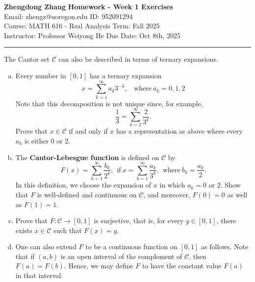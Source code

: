 \documentclass[letterpaper, 12pt]{article}
\begin{document}
\noindent
\large\textbf{Zhengdong Zhang} \hfill \textbf{Homework - Week 1 Exercises}   \\
Email: zhengz@uoregon.edu \hfill ID: 952091294 \\
\normalsize Course: MATH 616 - Real Analysis \hfill Term: Fall 2025 \\
Instructor: Professor Weiyong He \hfill Due Date: Oct 8th, 2025 \\
\noindent\rule{7in}{2.8pt}
\begin{problem}{1.2}
The Cantor set \(\mathcal{C}\) can also be described in terms of ternary expansions.
\begin{enumerate}[(a)]
    \item Every number in \([0,1]\) has a ternary expansion 
          \[x=\sum_{k=1}^\infty a_k 3^{-k},\ \ \ \ \text{where}\ a_k=0,1,2\]
          Note that this decomposition is not unique since, for example, 
          \[\frac{1}{3}=\sum_{k=2}^\infty \frac{2}{3^k}.\]
          Prove that \(x\in \mathcal{C}\) if and only if \(x\) has a representation as above where every \(a_k\) is either \(0\) or \(2\). 
    \item The \textbf{Cantor-Lebesgue function} is defined on \(\mathcal{C}\) by 
          \[F(x)=\sum_{k=1}^\infty \frac{b_k}{2^k},\ \ \text{if}\ x=\sum_{k=1}^\infty \frac{a_k}{3^k},\ \ \text{where}\ b_k=\frac{a_k}{2}.\]
          In this definition, we choose the expansion of \(x\) in which \(a_k=0\) or \(2\). Show that \(F\) is well-defined and continuous on \(\mathcal{C}\), and moreover, \(F(0)=0\) as well as \(F(1)=1\).
    \item Prove that \(F:\mathcal{C}\rightarrow [0,1]\) is surjective, that is, for every \(y\in [0,1]\), there exists \(x\in \mathcal{C}\) such that \(F(x)=y\).
    \item One can also extend \(F\) to be a continuous function on \([0,1]\) as follows. Note that if \((a,b)\) is an open interval of the complement of \(\mathcal{C}\), then \(F(a)=F(b)\). Hence, we may define \(F\) to have the constant value \(F(a)\) in that interval. 
\end{enumerate}
\end{problem}
\begin{solution}

\end{solution}
\end{document}
